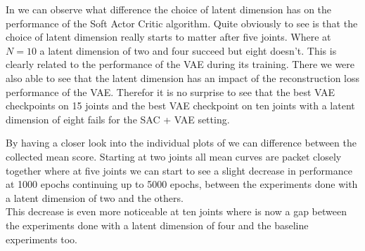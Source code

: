 In  we can observe what difference the choice of latent dimension has on the performance of the Soft Actor Critic algorithm. Quite obviously to see is that the choice of latent dimension really starts to matter after five joints. Where at $N=10$ a latent dimension of two and four succeed but eight doesn't. This is clearly related to the performance of the VAE during its training. There we were also able to see that the latent dimension has an impact of the reconstruction loss performance of the VAE. Therefor it is no surprise to see that the best VAE checkpoints on 15 joints and the best VAE checkpoint on ten joints with a latent dimension of eight fails for the SAC + VAE setting. 

By having a closer look into the individual plots of  we can difference between the collected mean score. Starting at two joints all mean curves are packet closely together where at five joints we can start to see a slight decrease in performance at 1000 epochs continuing up to 5000 epochs, between the experiments done with a latent dimension of two and the others.\\
This decrease is even more noticeable at ten joints where is now a gap between the experiments done with a latent dimension of four and the baseline experiments too.
